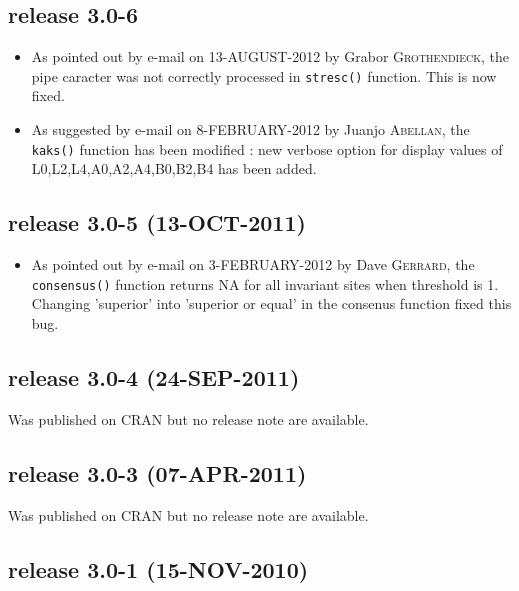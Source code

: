 \documentclass{article}
\begin{document}
\subsection*{release 3.0-6}


\begin{itemize}

\item As pointed out by e-mail on 13-AUGUST-2012 by Grabor \textsc{Grothendieck}, the pipe caracter was not correctly processed in \texttt{stresc()} function. This is now fixed.


\item As suggested by e-mail on 8-FEBRUARY-2012 by Juanjo \textsc{Abellan}, the   \texttt{kaks()}  function has been modified : new  verbose option for  display  values of L0,L2,L4,A0,A2,A4,B0,B2,B4 has been added.

\end{itemize}

\subsection*{release 3.0-5 (13-OCT-2011)}
\begin{itemize}

\item As pointed out by e-mail on 3-FEBRUARY-2012 by Dave \textsc{Gerrard}, the \texttt{consensus()} function returns NA for all invariant sites when threshold is 1. Changing 'superior' into 'superior or equal' in the consenus function fixed this bug.

\end{itemize}

\subsection*{release 3.0-4 (24-SEP-2011)}

Was published on CRAN but no release note are available.

\subsection*{release 3.0-3 (07-APR-2011)}

Was published on CRAN but no release note are available.

\subsection*{release 3.0-1 (15-NOV-2010)}
\end{document}

